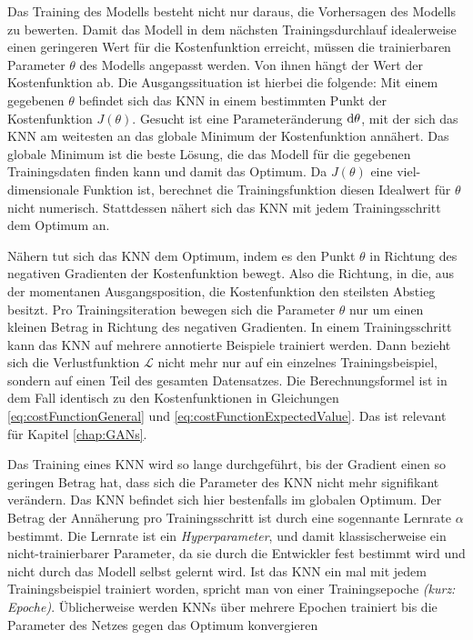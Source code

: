 Das Training des Modells besteht nicht nur daraus, die Vorhersagen des Modells zu bewerten. Damit das Modell in dem nächsten Trainingsdurchlauf idealerweise einen geringeren Wert für die Kostenfunktion erreicht, müssen die trainierbaren Parameter $\theta$ des Modells angepasst werden. Von ihnen hängt der Wert der Kostenfunktion ab. Die Ausgangssituation ist hierbei die folgende: Mit einem gegebenen $\theta$ befindet sich das \ac{KNN} in einem bestimmten Punkt der Kostenfunktion $J(\theta)$. Gesucht ist eine Parameteränderung $\mathop{}\!\mathrm{d}\theta$, mit der sich das \ac{KNN} am weitesten an das globale Minimum der Kostenfunktion annähert. Das globale Minimum ist die beste Lösung, die das Modell für die gegebenen Trainingsdaten finden kann und damit das Optimum. Da $J(\theta)$ eine viel-dimensionale Funktion ist, berechnet die Trainingsfunktion diesen Idealwert für $\theta$ nicht numerisch. Stattdessen nähert sich das \ac{KNN} mit jedem Trainingsschritt dem Optimum an. \cite{knnsKompakt}

Nähern tut sich das \ac{KNN} dem Optimum, indem es den Punkt $\theta$ in Richtung des negativen Gradienten der Kostenfunktion bewegt. Also die Richtung, in die, aus der momentanen Ausgangsposition, die Kostenfunktion den steilsten Abstieg besitzt. Pro Trainingsiteration bewegen sich die Parameter $\theta$ nur um einen kleinen Betrag in Richtung des negativen Gradienten. In einem Trainingsschritt kann das \ac{KNN} auf mehrere annotierte Beispiele trainiert werden. Dann bezieht sich die Verlustfunktion $\mathcal{L}$ nicht mehr nur auf ein einzelnes Trainingsbeispiel, sondern auf einen Teil des gesamten Datensatzes. Die Berechnungsformel ist in dem Fall identisch zu den Kostenfunktionen in Gleichungen \ref{eq:costFunctionGeneral} und \ref{eq:costFunctionExpectedValue}. Das ist relevant für Kapitel \ref{chap:GANs}. \cite{knnsKompakt}

Das Training eines \ac{KNN} wird so lange durchgeführt, bis der Gradient einen so geringen Betrag hat, dass sich die Parameter des \ac{KNN} nicht mehr signifikant verändern. Das \ac{KNN} befindet sich hier bestenfalls im globalen Optimum. Der Betrag der Annäherung pro Trainingsschritt ist durch eine sogennante Lernrate $\alpha$ bestimmt. Die Lernrate ist ein \emph{Hyperparameter}, und damit klassischerweise ein nicht-trainierbarer Parameter, da sie durch die Entwickler fest bestimmt wird und nicht durch das Modell selbst gelernt wird. Ist das \ac{KNN} ein mal mit jedem Trainingsbeispiel trainiert worden, spricht man von einer Trainingsepoche \emph{(kurz: Epoche)}. Üblicherweise werden \acp{KNN} über mehrere Epochen trainiert bis die Parameter des Netzes gegen das Optimum konvergieren \cite{knnsKompakt}

